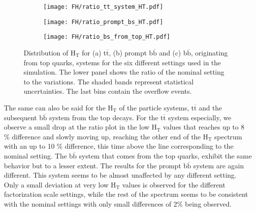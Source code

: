 \begin{figure}[H]
    \centering
    \begin{subfigure}{0.49\textwidth}
        \centering
        \texttt{[image: FH/ratio\_tt\_system\_HT.pdf]}
        \caption{}
        \label{subfig:HT(ttbar)_FH}
    \end{subfigure}
    \hfill
    \begin{subfigure}{0.49\textwidth}
        \centering
        \texttt{[image: FH/ratio\_prompt\_bs\_HT.pdf]}
        \caption{}
        \label{subfig:HT(bbbar_prompt)_FH}
    \end{subfigure}
    \hfill
    \begin{subfigure}{0.49\textwidth}
        \centering
        \texttt{[image: FH/ratio\_bs\_from\_top\_HT.pdf]}
        \caption{}
        \label{subfig:HT(bbbar)_FH}
    \end{subfigure}
    \caption{Distribution of H$_{\text{T}}$ for (a) t$\overline{\text{t}}$, (b) prompt b$\overline{\text{b}}$ and (c) b$\overline{\text{b}}$, originating from top quarks, systems for the six different settings used in the simulation. The lower panel shows the ratio of the nominal setting to the variations. The shaded bands represent statistical uncertainties. The last bins contain the overflow events.}
    \label{fig:HT_FH}
\end{figure}
The same can also be said for the H$_{\text{T}}$ of the particle systems, t$\overline{\text{t}}$ and the subsequent b$\overline{\text{b}}$ system from the top decays. For the t$\overline{\text{t}}$ system especially, we observe a small drop at the ratio plot in the low H$_{\text{T}}$ values that reaches up to 8 \% difference and slowly moving up, reaching the other end of the H$_{\text{T}}$ spectrum with an up to 10 \% difference, this time above the line corresponding to the nominal setting. The b$\overline{\text{b}}$ system that comes from the top quarks, exhibit the same behavior but to a lesser extent. The results for the prompt b$\overline{\text{b}}$ system are again different. This system seems to be almost unaffected by any different setting. Only a small deviation at very low H$_{\text{T}}$ values is observed for the different factorization scale settings, while the rest of the spectrum seems to be consistent with the nominal settings with only small differences of 2\%  being observed. \\
